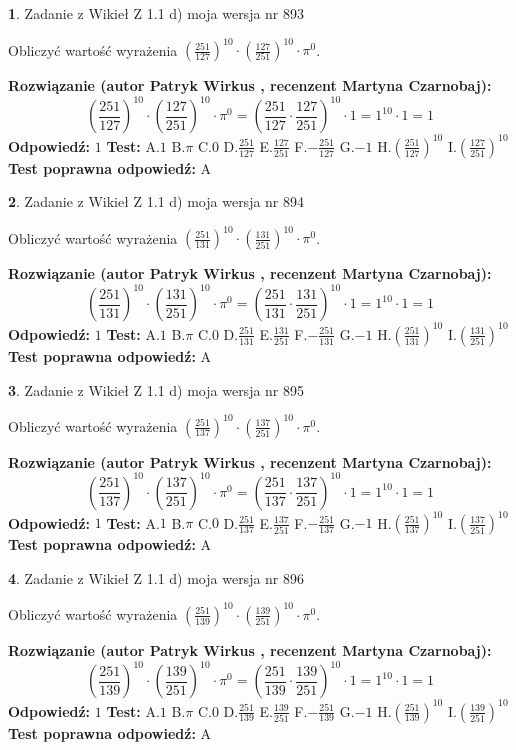 \documentclass[12pt, a4paper]{article}
\theoremstyle{definition} %
\newtheorem{zad}{}
\newcommand{\zadStart}[1]{\begin{zad}#1\newline}
\newcommand{\zadStop}{\end{zad}}
\newcommand{\rozwStart}[2]{\noindent \textbf{Rozwiązanie (autor #1 , recenzent #2): }\newline}
\newcommand{\rozwStop}{\newline}
\newcommand{\odpStart}{\noindent \textbf{Odpowiedź:}\newline}
\newcommand{\odpStop}{\newline}
\newcommand{\testStart}{\noindent \textbf{Test:}\newline}
\newcommand{\testStop}{\newline}
\newcommand{\kluczStart}{\noindent \textbf{Test poprawna odpowiedź:}\newline}
\newcommand{\kluczStop}{\newline}
\begin{document}
\zadStart{Zadanie z Wikieł Z 1.1 d) moja wersja nr 893}

Obliczyć wartość wyrażenia $(\frac{251}{127})^{10} \cdot (\frac{127}{251})^{10} \cdot \pi^{0}$.
\zadStop
\rozwStart{Patryk Wirkus}{Martyna Czarnobaj}
$$(\frac{251}{127})^{10} \cdot (\frac{127}{251})^{10} \cdot \pi^{0} = (\frac{251}{127} \cdot \frac{127}{251})^{10} \cdot 1 = 1^{10} \cdot 1 = 1$$
\rozwStop
\odpStart
$1$
\odpStop
\testStart
A.$1$ B.$\pi$ C.$0$ D.$\frac{251}{127}$ E.$\frac{127}{251}$
F.$-\frac{251}{127}$ G.$-1$
H.$(\frac{251}{127})^{10}$
I.$(\frac{127}{251})^{10}$
\testStop
\kluczStart
A
\kluczStop



\zadStart{Zadanie z Wikieł Z 1.1 d) moja wersja nr 894}

Obliczyć wartość wyrażenia $(\frac{251}{131})^{10} \cdot (\frac{131}{251})^{10} \cdot \pi^{0}$.
\zadStop
\rozwStart{Patryk Wirkus}{Martyna Czarnobaj}
$$(\frac{251}{131})^{10} \cdot (\frac{131}{251})^{10} \cdot \pi^{0} = (\frac{251}{131} \cdot \frac{131}{251})^{10} \cdot 1 = 1^{10} \cdot 1 = 1$$
\rozwStop
\odpStart
$1$
\odpStop
\testStart
A.$1$ B.$\pi$ C.$0$ D.$\frac{251}{131}$ E.$\frac{131}{251}$
F.$-\frac{251}{131}$ G.$-1$
H.$(\frac{251}{131})^{10}$
I.$(\frac{131}{251})^{10}$
\testStop
\kluczStart
A
\kluczStop



\zadStart{Zadanie z Wikieł Z 1.1 d) moja wersja nr 895}

Obliczyć wartość wyrażenia $(\frac{251}{137})^{10} \cdot (\frac{137}{251})^{10} \cdot \pi^{0}$.
\zadStop
\rozwStart{Patryk Wirkus}{Martyna Czarnobaj}
$$(\frac{251}{137})^{10} \cdot (\frac{137}{251})^{10} \cdot \pi^{0} = (\frac{251}{137} \cdot \frac{137}{251})^{10} \cdot 1 = 1^{10} \cdot 1 = 1$$
\rozwStop
\odpStart
$1$
\odpStop
\testStart
A.$1$ B.$\pi$ C.$0$ D.$\frac{251}{137}$ E.$\frac{137}{251}$
F.$-\frac{251}{137}$ G.$-1$
H.$(\frac{251}{137})^{10}$
I.$(\frac{137}{251})^{10}$
\testStop
\kluczStart
A
\kluczStop



\zadStart{Zadanie z Wikieł Z 1.1 d) moja wersja nr 896}

Obliczyć wartość wyrażenia $(\frac{251}{139})^{10} \cdot (\frac{139}{251})^{10} \cdot \pi^{0}$.
\zadStop
\rozwStart{Patryk Wirkus}{Martyna Czarnobaj}
$$(\frac{251}{139})^{10} \cdot (\frac{139}{251})^{10} \cdot \pi^{0} = (\frac{251}{139} \cdot \frac{139}{251})^{10} \cdot 1 = 1^{10} \cdot 1 = 1$$
\rozwStop
\odpStart
$1$
\odpStop
\testStart
A.$1$ B.$\pi$ C.$0$ D.$\frac{251}{139}$ E.$\frac{139}{251}$
F.$-\frac{251}{139}$ G.$-1$
H.$(\frac{251}{139})^{10}$
I.$(\frac{139}{251})^{10}$
\testStop
\kluczStart
A
\kluczStop
\end{document}
